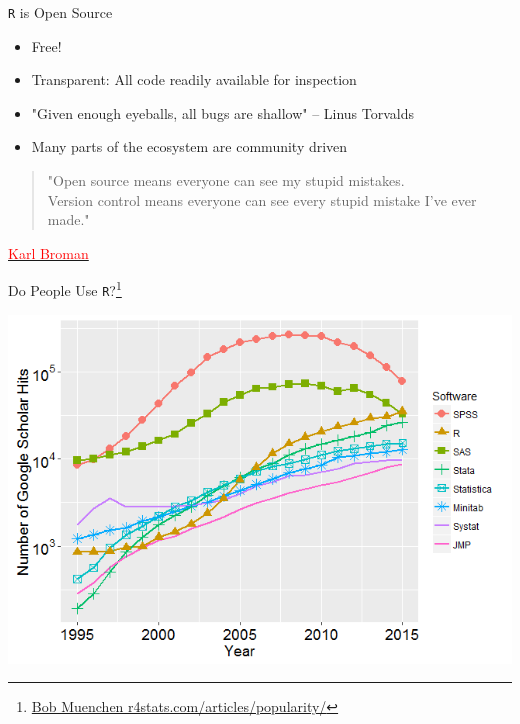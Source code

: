 \documentclass[aspectratio=169]{beamer}\usepackage[]{graphicx}\usepackage[]{color}
\begin{document}

\begin{frame}{\texttt{R} is Open Source}
  \begin{itemize}
    \item Free!
    \item Transparent: All code readily available for inspection
    \item "Given enough eyeballs, all bugs are shallow" -- Linus Torvalds
    \item Many parts of the ecosystem are community driven
  \end{itemize}

\begin{quote}
\begin{center}
\begin{Large}
"Open source means everyone can see my stupid mistakes.\\
Version control means everyone can see every stupid mistake I've ever made."
\end{Large}
\end{center}
\end{quote}

\begin{flushright}
\href{https://kbroman.wordpress.com/2011/08/17/the-stupidest-r-code-ever/}{\textcolor{red}{Karl Broman}}
\end{flushright}

\end{frame}


\begin{frame}{Do People Use \texttt{R}?\footnote{\href{r4stats.com/articles/popularity/}{Bob Muenchen r4stats.com/articles/popularity/}}}
\begin{center}
  \includegraphics[scale = 0.4]{w1408b.png}
\end{center}
\end{frame}
\end{document}
